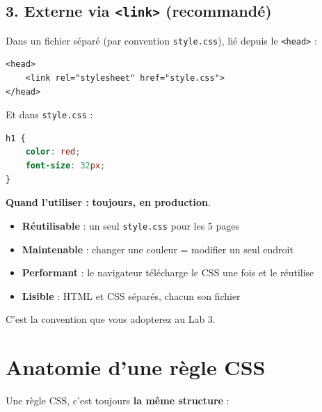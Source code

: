 \documentclass[11pt,a4paper]{article}
\begin{document}
\subsection{3. Externe via \texttt{<link>} (recommandé)}

Dans un fichier séparé (par convention \texttt{style.css}), lié depuis le
\texttt{<head>} :

\begin{lstlisting}[language=HTML5]
<head>
    <link rel="stylesheet" href="style.css">
</head>
\end{lstlisting}

Et dans \texttt{style.css} :

\begin{lstlisting}[language=CSS]
h1 {
    color: red;
    font-size: 32px;
}
\end{lstlisting}

\textbf{Quand l'utiliser :} \textbf{toujours, en production}.

\begin{retenirbox}
\begin{itemize}[nosep]
    \item \textbf{Réutilisable} : un seul \texttt{style.css} pour les 5 pages
    \item \textbf{Maintenable} : changer une couleur = modifier un seul endroit
    \item \textbf{Performant} : le navigateur télécharge le CSS une fois et le réutilise
    \item \textbf{Lisible} : HTML et CSS séparés, chacun son fichier
\end{itemize}
C'est la convention que vous adopterez au Lab 3.
\end{retenirbox}

\newpage

\section{Anatomie d'une règle CSS}

Une règle CSS, c'est toujours \textbf{la même structure} :
\end{document}
